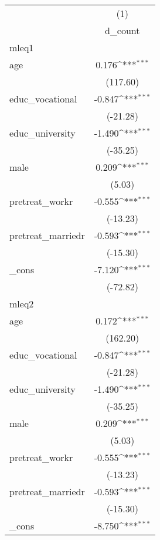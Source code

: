 {
\def\sym#1{\ifmmode^{#1}\else\(^{#1}\)\fi}
\begin{tabular}{l*{1}{c}}
\hline\hline
            &\multicolumn{1}{c}{(1)}\\
            &\multicolumn{1}{c}{d\_count}\\
\hline
mleq1       &                     \\
age         &       0.176\sym{***}\\
            &    (117.60)         \\
[1em]
educ\_vocational&      -0.847\sym{***}\\
            &    (-21.28)         \\
[1em]
educ\_university&      -1.490\sym{***}\\
            &    (-35.25)         \\
[1em]
male        &       0.209\sym{***}\\
            &      (5.03)         \\
[1em]
pretreat\_workr&      -0.555\sym{***}\\
            &    (-13.23)         \\
[1em]
pretreat\_marriedr&      -0.593\sym{***}\\
            &    (-15.30)         \\
[1em]
\_cons      &      -7.120\sym{***}\\
            &    (-72.82)         \\
\hline
mleq2       &                     \\
age         &       0.172\sym{***}\\
            &    (162.20)         \\
[1em]
educ\_vocational&      -0.847\sym{***}\\
            &    (-21.28)         \\
[1em]
educ\_university&      -1.490\sym{***}\\
            &    (-35.25)         \\
[1em]
male        &       0.209\sym{***}\\
            &      (5.03)         \\
[1em]
pretreat\_workr&      -0.555\sym{***}\\
            &    (-13.23)         \\
[1em]
pretreat\_marriedr&      -0.593\sym{***}\\
            &    (-15.30)         \\
[1em]
\_cons      &      -8.750\sym{***}\\

\end{tabular}}
